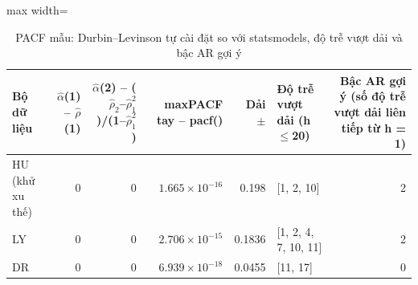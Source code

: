 \begin{table}[H]
\centering\footnotesize
\caption{PACF mẫu: Durbin–Levinson tự cài đặt so với statsmodels, độ trễ vượt dải và bậc AR gợi ý}\label{tab:tab_b11_11_pacf}
\begin{adjustbox}{max width=\linewidth}
\begin{tabular}{|l|r|r|r|r|l|r|}
\toprule
Bộ dữ liệu & $\hat{\alpha}$(1) – $\hat{\rho}$(1) & $\hat{\alpha}$(2) – ($\hat{\rho}_{2}$–$\hat{\rho}_{1}^{2}$)/(1–$\hat{\rho}_{1}^{2}$) & max\textbar{}PACF tay – pacf()\textbar{} & Dải $\pm$ & Độ trễ vượt dải (h$\le$20) & Bậc AR gợi ý (số độ trễ vượt dải liên tiếp từ h = 1) \\
\midrule
HU (khử xu thế) & 0 & 0 & $1.665\times10^{-16}$ & 0.198 & [1, 2, 10] & 2 \\
LY & 0 & 0 & $2.706\times10^{-15}$ & 0.1836 & [1, 2, 4, 7, 10, 11] & 2 \\
DR & 0 & 0 & $6.939\times10^{-18}$ & 0.0455 & [11, 17] & 0 \\
\bottomrule
\end{tabular}
\end{adjustbox}
\end{table}
